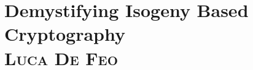 

\chapter[toc=Demystifying Isogeny Based Cryptography\\{\protect\small\emph{Luca De Feo}}, headings=Isogeny Based Cryptography]{Demystifying Isogeny Based Cryptography\\\vspace{2mm}\normalsize \textsc{Luca De Feo}\protect}


